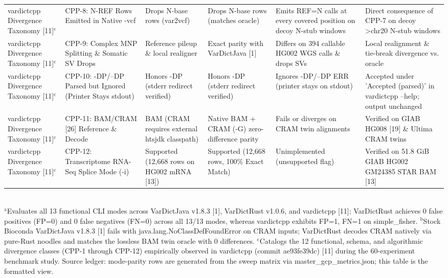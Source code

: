 \begin{table}[htbp]
{\begin{tabular}{llllll}
vardictcpp Divergence Taxonomy [11]$^{\text{c}}$ & CPP-8: N-REF Rows Emitted in Native -vcf & Drops N-base rows (var2vcf) & Drops N-base rows (matches oracle) & Emits REF=N calls at every covered position on decoy N-stub windows & Direct consequence of CPP-7 on decoy \textgreater{}chr20 N-stub windows \\
vardictcpp Divergence Taxonomy [11]$^{\text{c}}$ & CPP-9: Complex MNP Splitting \& Somatic SV Drops & Reference pileup \& local realigner & Exact parity with VarDictJava [1] & Differs on 394 callable HG002 WGS calls \& drops SVs & Local realignment \& tie-break divergence vs. oracle \\
vardictcpp Divergence Taxonomy [11]$^{\text{c}}$ & CPP-10: -DP/--DP Parsed but Ignored (Printer Stays stdout) & Honors -DP (stderr redirect verified) & Honors -DP (stderr redirect verified) & Ignores -DP/--DP ERR (printer stays on stdout) & Accepted under 'Accepted (parsed)' in vardictcpp --help; output unchanged \\
vardictcpp Divergence Taxonomy [11]$^{\text{c}}$ & CPP-11: BAM/CRAM [26] Reference \& Decode & BAM (CRAM requires external htsjdk classpath) & Native BAM + CRAM (-G) zero-difference parity & Fails or diverges on CRAM twin alignments & Verified on GIAB HG008 [19] \& Ultima CRAM twins \\
vardictcpp Divergence Taxonomy [11]$^{\text{c}}$ & CPP-12: Transcriptome RNA-Seq Splice Mode (-i) & Supported (12,668 rows on HG002 mRNA [13]) & Supported (12,668 rows, 100\% Exact Match) & Unimplemented (unsupported flag) & Verified on 51.8 GiB GIAB HG002 GM24385 STAR BAM [13] \\
\hline
\end{tabular}%
}
\\[4pt]\footnotesize{$^{\text{a}}$Evaluates all 13 functional CLI modes across VarDictJava v1.8.3 [1], VarDictRust v1.0.6, and vardictcpp [11]; VarDictRust achieves 0 false positives (FP=0) and 0 false negatives (FN=0) across all 13/13 modes, whereas vardictcpp exhibits FP=1, FN=1 on simple\_fisher. $^{\text{b}}$Stock Bioconda VarDictJava v1.8.3 [1] fails with java.lang.NoClassDefFoundError on CRAM inputs; VarDictRust decodes CRAM natively via pure-Rust noodles and matches the lossless BAM twin oracle with 0 differences. $^{\text{c}}$Catalogs the 12 functional, schema, and algorithmic divergence classes (CPP-1 through CPP-12) empirically observed in vardictcpp (commit ae93fe39dc) [11] during the 60-experiment benchmark study. Source ledger: mode-parity rows are generated from the sweep matrix via master\_gcp\_metrics.json; this table is the formatted view.}
\end{table}
